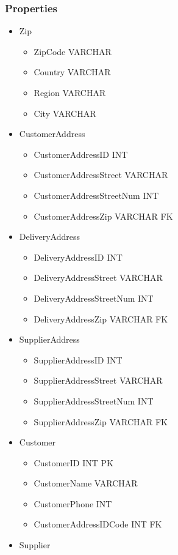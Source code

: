 \documentclass[11pt]{article}
\begin{document}
\subsubsection{Properties}
\label{sec:org5e949b9}
\begin{itemize}
\item Zip
\begin{itemize}
\item ZipCode VARCHAR
\item Country VARCHAR
\item Region VARCHAR
\item City VARCHAR
\end{itemize}
\item CustomerAddress
\begin{itemize}
\item CustomerAddressID INT
\item CustomerAddressStreet VARCHAR
\item CustomerAddressStreetNum INT
\item CustomerAddressZip VARCHAR FK
\end{itemize}
\item DeliveryAddress
\begin{itemize}
\item DeliveryAddressID INT
\item DeliveryAddressStreet VARCHAR
\item DeliveryAddressStreetNum INT
\item DeliveryAddressZip VARCHAR FK
\end{itemize}
\item SupplierAddress
\begin{itemize}
\item SupplierAddressID INT
\item SupplierAddressStreet VARCHAR
\item SupplierAddressStreetNum INT
\item SupplierAddressZip VARCHAR FK
\end{itemize}
\item Customer
\begin{itemize}
\item CustomerID INT PK
\item CustomerName VARCHAR
\item CustomerPhone INT
\item CustomerAddressIDCode INT FK
\end{itemize}
\item Supplier
\begin{itemize}

\end{itemize}
\end{itemize}
\end{document}
